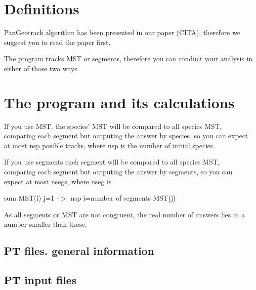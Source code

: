 
\section*{Definitions}

% 
% 


PanGeotrack algorithm has been presented in our paper (CITA), therefore we suggest you to read the paper first.




The program tracks MST or segments, therefore you can conduct your analysis in either of those two ways.


\section*{The program and its calculations}
	



If you use MST, the species' MST will be compared to all species MST, comparing each segment but outputing the answer by species, so you can expect at most nsp posible tracks, where nsp is the number of initial species.
	

\vspace{-7\baselineskip}
\vspace{7\baselineskip}

If you use segments each segment will be compared to all species MST, comparing each segment but outputing the answer by segments, so you 	can expect at most nsegs, where nseg is
	
	sum MST(i)
		j=1 -$>$ nsp
		i=number of segments MST(j)
		    
		
As all segments or MST are not congruent, the real number of answers lies in a number smaller than those.



\subsection*{PT files. general information}

\subsection*{PT input files}

